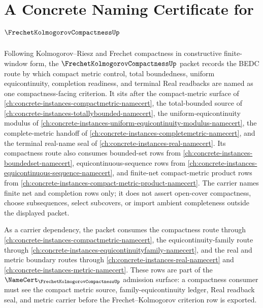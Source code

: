 \chapter{A Concrete Naming Certificate for $\FrechetKolmogorovCompactnessUp$}
\label{ch:concrete-instances-frechet-kolmogorov-compactness-namecert}

Following Kolmogorov--Riesz and Frechet compactness in constructive finite-window form, the $\FrechetKolmogorovCompactnessUp$ packet records the BEDC route by which compact metric control, total boundedness, uniform equicontinuity, completion readiness, and terminal Real readbacks are named as one compactness-facing criterion. It sits after the compact-metric surface of \autoref{ch:concrete-instances-compactmetric-namecert}, the total-bounded source of \autoref{ch:concrete-instances-totallybounded-namecert}, the uniform-equicontinuity modulus of \autoref{ch:concrete-instances-uniform-equicontinuity-modulus-namecert}, the complete-metric handoff of \autoref{ch:concrete-instances-completemetric-namecert}, and the terminal real-name seal of \autoref{ch:concrete-instances-real-namecert}. Its compactness route also consumes bounded-set rows from \autoref{ch:concrete-instances-boundedset-namecert}, equicontinuous-sequence rows from \autoref{ch:concrete-instances-equicontinuous-sequence-namecert}, and finite-net compact-metric product rows from \autoref{ch:concrete-instances-compact-metric-product-namecert}. The carrier names finite net and completion rows only; it does not assert open-cover compactness, choose subsequences, select subcovers, or import ambient completeness outside the displayed packet.

As a carrier dependency, the packet consumes the compactness route through \autoref{ch:concrete-instances-compactmetric-namecert}, the equicontinuity-family route through \autoref{ch:concrete-instances-equicontinuityfamily-namecert}, and the real and metric boundary routes through \autoref{ch:concrete-instances-real-namecert} and \autoref{ch:concrete-instances-metric-namecert}. These rows are part of the $\NameCert_{\FrechetKolmogorovCompactnessUp}$ admission surface: a compactness consumer must see the compact metric source, family-equicontinuity ledger, Real readback seal, and metric carrier before the Frechet--Kolmogorov criterion row is exported.

